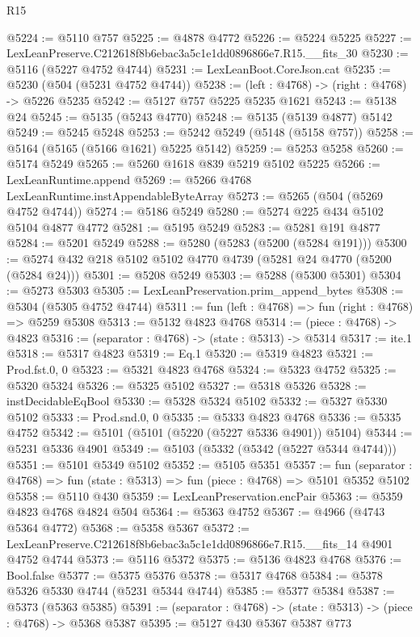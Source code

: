 \begin{lexlean}{R15}
\begin{coremodule}
{{{{{{{{{{{@5224 := @5110 @757
@5225 := @4878 @4772
@5226 := @5224 @5225
@5227 := LexLeanPreserve.C212618f8b6ebac3a5c1e1dd0896866e7.R15.__fits_30
@5230 := @5116 (@5227 @4752 @4744)
@5231 := LexLeanBoot.CoreJson.cat
@5235 := @5230 (@504 (@5231 @4752 @4744))
@5238 := (left : @4768) -> (right : @4768) -> @5226 @5235
@5242 := @5127 @757 @5225 @5235 @1621
@5243 := @5138 @24
@5245 := @5135 (@5243 @4770)
@5248 := @5135 (@5139 @4877) @5142
@5249 := @5245 @5248
@5253 := @5242 @5249 (@5148 (@5158 @757))
@5258 := @5164 (@5165 (@5166 @1621) @5225 @5142)
@5259 := @5253 @5258
@5260 := @5174 @5249
@5265 := @5260 @1618 @839 @5219 @5102 @5225
@5266 := LexLeanRuntime.append
@5269 := @5266 @4768 LexLeanRuntime.instAppendableByteArray
@5273 := @5265 (@504 (@5269 @4752 @4744))
@5274 := @5186 @5249
@5280 := @5274 @225 @434 @5102 @5104 @4877 @4772
@5281 := @5195 @5249
@5283 := @5281 @191 @4877
@5284 := @5201 @5249
@5288 := @5280 (@5283 (@5200 (@5284 @191)))
@5300 := @5274 @432 @218 @5102 @5102 @4770 @4739 (@5281 @24 @4770 (@5200 (@5284 @24)))
@5301 := @5208 @5249
@5303 := @5288 (@5300 @5301)
@5304 := @5273 @5303
@5305 := LexLeanPreservation.prim_append_bytes
@5308 := @5304 (@5305 @4752 @4744)
@5311 := fun (left : @4768) => fun (right : @4768) => @5259 @5308
@5313 := @5132 @4823 @4768
@5314 := (piece : @4768) -> @4823
@5316 := (separator : @4768) -> (state : @5313) -> @5314
@5317 := ite.{1}
@5318 := @5317 @4823
@5319 := Eq.{1}
@5320 := @5319 @4823
@5321 := Prod.fst.{0, 0}
@5323 := @5321 @4823 @4768
@5324 := @5323 @4752
@5325 := @5320 @5324
@5326 := @5325 @5102
@5327 := @5318 @5326
@5328 := instDecidableEqBool
@5330 := @5328 @5324 @5102
@5332 := @5327 @5330 @5102
@5333 := Prod.snd.{0, 0}
@5335 := @5333 @4823 @4768
@5336 := @5335 @4752
@5342 := @5101 (@5101 (@5220 (@5227 @5336 @4901)) @5104)
@5344 := @5231 @5336 @4901
@5349 := @5103 (@5332 (@5342 (@5227 @5344 @4744)))
@5351 := @5101 @5349 @5102
@5352 := @5105 @5351
@5357 := fun (separator : @4768) => fun (state : @5313) => fun (piece : @4768) => @5101 @5352 @5102
@5358 := @5110 @430
@5359 := LexLeanPreservation.encPair
@5363 := @5359 @4823 @4768 @4824 @504
@5364 := @5363 @4752
@5367 := @4966 (@4743 @5364 @4772)
@5368 := @5358 @5367
@5372 := LexLeanPreserve.C212618f8b6ebac3a5c1e1dd0896866e7.R15.__fits_14 @4901 @4752 @4744
@5373 := @5116 @5372
@5375 := @5136 @4823 @4768
@5376 := Bool.false
@5377 := @5375 @5376
@5378 := @5317 @4768
@5384 := @5378 @5326 @5330 @4744 (@5231 @5344 @4744)
@5385 := @5377 @5384
@5387 := @5373 (@5363 @5385)
@5391 := (separator : @4768) -> (state : @5313) -> (piece : @4768) -> @5368 @5387
@5395 := @5127 @430 @5367 @5387 @773
}}}}}}}}}}}
\end{coremodule}
\end{lexlean}
